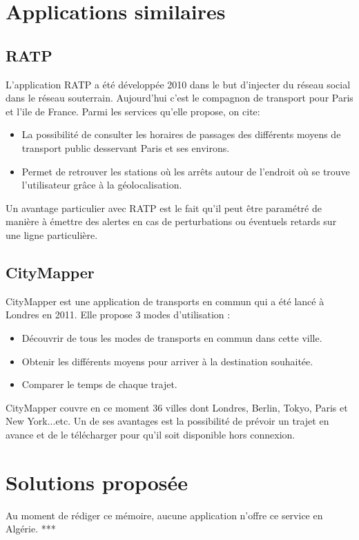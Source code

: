 \section{Applications similaires}			
\subsection{RATP}
L'application RATP a été développée 2010 dans le but d'injecter du réseau social dans le réseau souterrain. Aujourd'hui c'est le compagnon de transport pour Paris et l'ile de France.
Parmi les services qu'elle propose, on cite:
\begin{itemize}
	\item La possibilité de consulter les horaires de passages des différents moyens de transport public desservant Paris et ses environs. 
	\item Permet de retrouver les stations où les arrêts autour de l'endroit où se trouve l'utilisateur grâce à la géolocalisation.
\end{itemize}
Un avantage particulier avec RATP est le fait qu'il peut être paramétré de manière à émettre des alertes en cas de perturbations ou éventuels retards sur une ligne particulière.
	
\subsection{CityMapper}
CityMapper est une application de transports en commun qui a été lancé à Londres en 2011.
Elle propose 3 modes d'utilisation : 
\begin{itemize}
	\item Découvrir de tous les modes de transports en commun dans cette ville.
	\item Obtenir les différents moyens pour arriver à la destination souhaitée.
	\item Comparer le temps de chaque trajet.
\end{itemize}

CityMapper couvre en ce moment 36 villes dont Londres, Berlin, Tokyo, Paris et New York...etc.  Un de ses avantages est la possibilité de prévoir un trajet en avance et de le télécharger pour qu'il soit disponible hors connexion.

\section{Solutions proposée}
Au moment de rédiger ce mémoire, aucune application n'offre ce service en Algérie. ***


